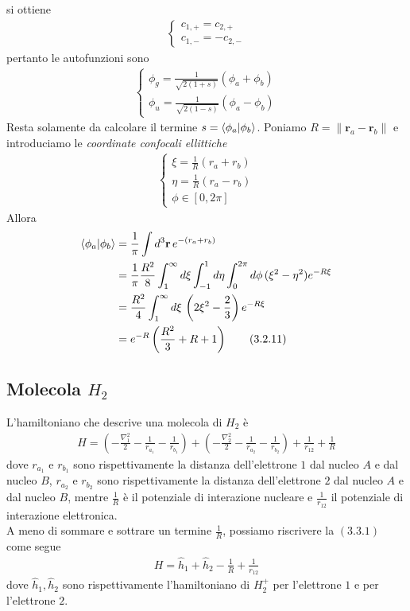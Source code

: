 \documentclass{article}
\begin{document}
si ottiene 
\begin{align}
    \begin{cases}
        c_{1, +} = c_{2, +} \\
        c_{1, -} = -c_{2, -}
    \end{cases} \tag{3.2.8}
\end{align}
pertanto le autofunzioni sono 
\begin{align}
    \begin{cases}
        \phi_g = \frac{1}{\sqrt{2(1 + s)}}(\phi_a + \phi_b) \\
        \phi_u = \frac{1}{\sqrt{2(1 - s)}}(\phi_a - \phi_b)
    \end{cases} \tag{3.2.9}
\end{align}
Resta solamente da calcolare il termine $s = \braket{\phi_a|\phi_b}$. Poniamo $R = \|\mathbf{r}_a - \mathbf{r}_b\|$ e introduciamo le \textit{coordinate confocali ellittiche}
\begin{align}
    \begin{cases}
        \xi = \frac{1}{R}(r_a + r_b) \\
        \eta = \frac{1}{R}(r_a - r_b) \\
        \phi \in [0, 2\pi]
    \end{cases} \tag{3.2.10}
\end{align}
Allora
\begin{align}
    \braket{\phi_a|\phi_b} &= \frac{1}{\pi}\int d^3\mathbf{r} \, e^{-(r_a + r_b)} \notag \\
    &= \frac{1}{\pi}\frac{R^2}{8}\int_1^\infty d\xi \int_{-1}^1 d\eta \int_0^{2\pi} d\phi \, (\xi^2 - \eta^2)e^{-R\xi} \notag \\
    &= \frac{R^2}{4}\int_1^\infty d\xi \, \left(2\xi^2 - \frac{2}{3}\right)e^{-R\xi} \notag \\
    &= e^{-R}\left(\frac{R^2}{3} + R + 1\right) \tag{3.2.11}
\end{align}

\newpage
\subsection{Molecola $H_2$}
L'hamiltoniano che descrive una molecola di $H_2$ è 
\begin{align}
    H = \left(-\frac{\nabla^2_1}{2} - \frac{1}{r_{a_1}} - \frac{1}{r_{b_1}}\right) + \left(-\frac{\nabla^2_2}{2} - \frac{1}{r_{a_2}} - \frac{1}{r_{b_2}}\right) + \frac{1}{r_{12}} + \frac{1}{R} \tag{3.3.1}
\end{align}
dove $r_{a_1}$ e $r_{b_1}$ sono rispettivamente la distanza dell'elettrone $1$ dal nucleo $A$ e dal nucleo $B$, $r_{a_2}$ e $r_{b_2}$ sono rispettivamente la distanza dell'elettrone $2$ dal nucleo $A$ e dal nucleo $B$, mentre $\frac{1}{R}$ è il potenziale di interazione nucleare e $\frac{1}{r_{12}}$ il potenziale di interazione elettronica. \\
A meno di sommare e sottrare un termine $\frac{1}{R}$, possiamo riscrivere la $(3.3.1)$ come segue
\begin{align}
    H = \hat{h}_1 + \hat{h}_2 - \frac{1}{R} + \frac{1}{r_{12}} \tag{3.3.2}
\end{align}
dove $\hat{h}_1, \hat{h}_2$ sono rispettivamente l'hamiltoniano di $H^+_2$ per l'elettrone $1$ e per l'elettrone $2$.
\end{document}
